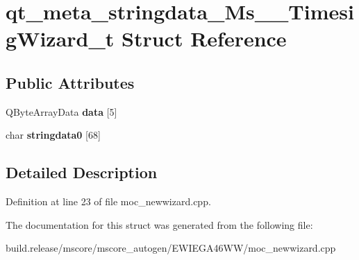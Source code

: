 \hypertarget{structqt__meta__stringdata___ms_____timesig_wizard__t}{}\section{qt\+\_\+meta\+\_\+stringdata\+\_\+\+Ms\+\_\+\+\_\+\+Timesig\+Wizard\+\_\+t Struct Reference}
\label{structqt__meta__stringdata___ms_____timesig_wizard__t}
\subsection*{Public Attributes}
\begin{DoxyCompactItemize}
\item 
\mbox{\label{structqt__meta__stringdata___ms_____timesig_wizard__t_ab0006e6589d67281ff337f5ced3f991b}} 
Q\+Byte\+Array\+Data {\bfseries data} \mbox{[}5\mbox{]}
\item 
\mbox{\label{structqt__meta__stringdata___ms_____timesig_wizard__t_a2c2db3caa68e7bfa291c891f69a35735}} 
char {\bfseries stringdata0} \mbox{[}68\mbox{]}
\end{DoxyCompactItemize}


\subsection{Detailed Description}


Definition at line 23 of file moc\+\_\+newwizard.\+cpp.



The documentation for this struct was generated from the following file\+:\begin{DoxyCompactItemize}
\item 
build.\+release/mscore/mscore\+\_\+autogen/\+E\+W\+I\+E\+G\+A46\+W\+W/moc\+\_\+newwizard.\+cpp\end{DoxyCompactItemize}
